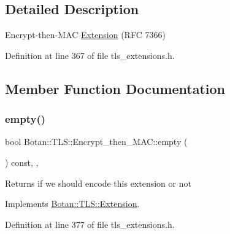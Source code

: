 \subsection{Detailed Description}
Encrypt-\/then-\/\+M\+AC \mbox{\hyperlink{class_botan_1_1_t_l_s_1_1_extension}{Extension}} (R\+FC 7366) 

Definition at line 367 of file tls\+\_\+extensions.\+h.



\subsection{Member Function Documentation}
\mbox{\label{class_botan_1_1_t_l_s_1_1_encrypt__then___m_a_c_af8412e160e798f87de854889a66faec5}} 
\subsubsection{\texorpdfstring{empty()}{empty()}}
{\footnotesize\ttfamily bool Botan\+::\+T\+L\+S\+::\+Encrypt\+\_\+then\+\_\+\+M\+A\+C\+::empty (\begin{DoxyParamCaption}{ }\end{DoxyParamCaption}) const\hspace{0.3cm}{\ttfamily [inline]}, {\ttfamily [override]}, {\ttfamily [virtual]}}

\begin{DoxyReturn}{Returns}
if we should encode this extension or not 
\end{DoxyReturn}


Implements \mbox{\hyperlink{class_botan_1_1_t_l_s_1_1_extension_aa850b9be2322f94e7c65e583cd51acc5}{Botan\+::\+T\+L\+S\+::\+Extension}}.



Definition at line 377 of file tls\+\_\+extensions.\+h.

\mbox{\label{class_botan_1_1_t_l_s_1_1_encrypt__then___m_a_c_a599289acb3fc84c9e34a1dee1345904e}} 
